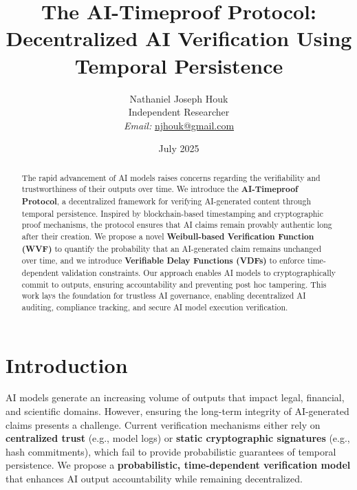 \documentclass[12pt]{report}
\begin{document}
\title{The AI-Timeproof Protocol: Decentralized AI Verification Using Temporal Persistence}
\author{Nathaniel Joseph Houk\\
Independent Researcher\\
\textit{Email:} \href{mailto:njhouk@gmail.com}{njhouk@gmail.com}}
\date{July 2025}
\maketitle

\begin{abstract}
The rapid advancement of AI models raises concerns regarding the verifiability and trustworthiness of their outputs over time. We introduce the \textbf{AI-Timeproof Protocol}, a decentralized framework for verifying AI-generated content through temporal persistence. Inspired by blockchain-based timestamping and cryptographic proof mechanisms, the protocol ensures that AI claims remain provably authentic long after their creation. We propose a novel \textbf{Weibull-based Verification Function (WVF)} to quantify the probability that an AI-generated claim remains unchanged over time, and we introduce \textbf{Verifiable Delay Functions (VDFs)} to enforce time-dependent validation constraints. Our approach enables AI models to cryptographically commit to outputs, ensuring accountability and preventing post hoc tampering. This work lays the foundation for trustless AI governance, enabling decentralized AI auditing, compliance tracking, and secure AI model execution verification.
\end{abstract}

\section{Introduction}

AI models generate an increasing volume of outputs that impact legal, financial, and scientific domains. However, ensuring the long-term integrity of AI-generated claims presents a challenge. Current verification mechanisms either rely on \textbf{centralized trust} (e.g., model logs) or \textbf{static cryptographic signatures} (e.g., hash commitments), which fail to provide probabilistic guarantees of temporal persistence. We propose a \textbf{probabilistic, time-dependent verification model} that enhances AI output accountability while remaining decentralized.
\end{document}
